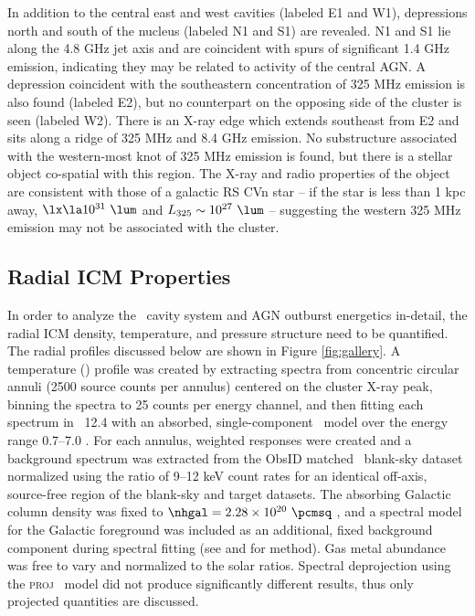 \documentclass[iop]{emulateapj-rtx4}
\begin{document}
In addition to the central east and west cavities (labeled E1 and W1),
depressions north and south of the nucleus (labeled N1 and S1) are
revealed. N1 and S1 lie along the 4.8 GHz jet axis and are coincident
with spurs of significant 1.4 GHz emission, indicating they may be
related to activity of the central AGN. A depression coincident with
the southeastern concentration of 325 MHz emission is also found
(labeled E2), but no counterpart on the opposing side of the cluster
is seen (labeled W2). There is an X-ray edge which extends southeast
from E2 and sits along a ridge of 325 MHz and 8.4 GHz emission. No
substructure associated with the western-most knot of 325 MHz emission
is found, but there is a stellar object co-spatial with this region.
The X-ray and radio properties of the object are consistent with those
of a galactic RS CVn star \citep{1993RPPh...56.1145S} -- if the star
is less than 1 kpc away, $\lx \la 10^{31} ~\lum$ and $L_{325} \sim
10^{27} ~\lum$ -- suggesting the western 325 MHz emission may not be
associated with the cluster.

\subsection{Radial ICM Properties}
\label{sec:icm}

In order to analyze the \rbs\ cavity system and AGN outburst
energetics in-detail, the radial ICM density, temperature, and
pressure structure need to be quantified. The radial profiles
discussed below are shown in Figure \ref{fig:gallery}. A temperature
(\tx) profile was created by extracting spectra from concentric
circular annuli (2500 source counts per annulus) centered on the
cluster X-ray peak, binning the spectra to 25 counts per energy
channel, and then fitting each spectrum in \xspec\ 12.4 \citep{xspec}
with an absorbed, single-component \mekal\ model \citep{mekal1} over
the energy range 0.7--7.0 \keV. For each annulus, weighted responses
were created and a background spectrum was extracted from the ObsID
matched \caldb\ blank-sky dataset normalized using the ratio of 9--12
keV count rates for an identical off-axis, source-free region of the
blank-sky and target datasets. The absorbing Galactic column density
was fixed to $\nhgal = 2.28 \times 10^{20} ~\pcmsq$ \citep{lab}, and a
spectral model for the Galactic foreground was included as an
additional, fixed background component during spectral fitting (see
\citealt{2005ApJ...628..655V} and \citealt{xrayband} for method). Gas
metal abundance was free to vary and normalized to the \citet{ag89}
solar ratios. Spectral deprojection using the {\textsc{proj}}
\xspec\ model did not produce significantly different results, thus
only projected quantities are discussed.
\end{document}

